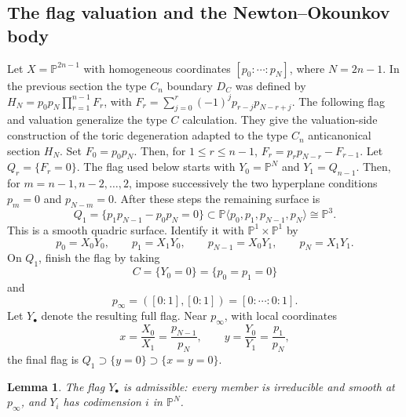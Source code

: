 \documentclass{article}
\newtheorem{lemma}[thm]{Lemma}
\newcommand{\PP}{\mathbb{P}}
\begin{document}
\subsection{The flag valuation and the Newton--Okounkov body}
Let \(X=\PP^{2n-1}\) with homogeneous coordinates \([p_0:\cdots:p_N]\), where \(N=2n-1\). In the previous section the type \(C_n\) boundary \(D_C\) was defined by \(H_N=p_0p_N\prod_{r=1}^{n-1}F_r\), with \(F_r=\sum_{j=0}^r(-1)^jp_{r-j}p_{N-r+j}\).
The following flag and valuation generalize the type \(C\) calculation. They give the valuation-side construction of the toric degeneration adapted to the type \(C_n\) anticanonical section \(H_N\).
Set \(F_0=p_0p_N\). Then, for \(1\le r\le n-1\), \(F_r=p_rp_{N-r}-F_{r-1}\).
Let \(Q_r=\{F_r=0\}\). The flag used below starts with \(Y_0=\PP^N\) and \(Y_1=Q_{n-1}\). Then, for \(m=n-1,n-2,\ldots,2\), impose successively the two hyperplane conditions \(p_m=0\) and \(p_{N-m}=0\).
After these steps the remaining surface is
\[
Q_1=\{p_1p_{N-1}-p_0p_N=0\}
\subset \PP\langle p_0,p_1,p_{N-1},p_N\rangle\cong \PP^3.
\]
This is a smooth quadric surface. Identify it with \(\PP^1\times\PP^1\) by
\[
p_0=X_0Y_0,
\qquad
p_1=X_1Y_0,
\qquad
p_{N-1}=X_0Y_1,
\qquad
p_N=X_1Y_1.
\]
On \(Q_1\), finish the flag by taking
\[
C=\{Y_0=0\}=\{p_0=p_1=0\}
\]
and
\[
p_\infty=([0:1],[0:1])=[0:\cdots:0:1].
\]
Let \(Y_\bullet\) denote the resulting full flag. Near \(p_\infty\), with local coordinates
\[
x=\frac{X_0}{X_1}=\frac{p_{N-1}}{p_N},
\qquad
 y=\frac{Y_0}{Y_1}=\frac{p_1}{p_N},
\]
the final flag is \(Q_1\supset\{y=0\}\supset\{x=y=0\}\).

\begin{lemma}\label{lem:flag-admissible}
The flag \(Y_\bullet\) is admissible: every member is irreducible and smooth at \(p_\infty\), and \(Y_i\) has codimension \(i\) in \(\PP^N\).
\end{lemma}
\end{document}
